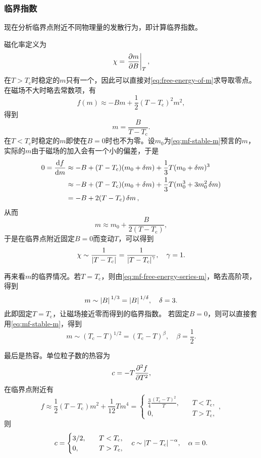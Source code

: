 \documentclass[hyperref, UTF8, a4paper]{ctexart}
\begin{document}
\subsubsection{临界指数}

现在分析临界点附近不同物理量的发散行为，即计算临界指数。

磁化率定义为
\[
    \chi = \eval{\pdv{m}{B}}_{T},
\]
在$T>T_\text{c}$时稳定的$m$只有一个，因此可以直接对\eqref{eq:free-energy-of-m}求导取零点。
在磁场不大时略去常数项，有
\[
    f(m) \approx - B m + \frac{1}{2} (T-T_\text{c})^2 m^2,
\]
得到
\[
    m = \frac{B}{T-T_\text{c}}.
\]
在$T<T_\text{c}$时稳定的$m$即使在$B=0$时也不为零。设$m_0$为\eqref{eq:mf-stable-m}预言的$m$，实际的$m$由于磁场的加入会有一个小的偏差，于是
\[
    \begin{aligned}
        0 = \dv{f}{m} &\approx - B + (T - T_\text{c}) (m_0 + \var{m}) + \frac{1}{3} T (m_0 + \var{m})^3 \\
        &\approx - B + (T-T_\text{c}) (m_0 + \var{m}) + \frac{1}{3} T (m_0^3 + 3 m_0^2 \var{m}) \\
        &= - B + 2(T-T_\text{c}) \var{m},
    \end{aligned}
\]
从而
\[
    m \approx m_0 + \frac{B}{2(T-T_\text{c})},
\]
于是在临界点附近固定$B=0$而变动$T$，可以得到
\begin{equation}
    \chi \sim \frac{1}{\abs{T-T_\text{c}}} = \frac{1}{\abs{T-T_\text{c}}^\gamma}, \quad \gamma = 1. 
\end{equation}

再来看$m$的临界情况。若$T=T_\text{c}$，则由\eqref{eq:mf-free-energy-series-m}，略去高阶项，得到
\begin{equation}
    m \sim \abs*{B}^{1/3} = \abs*{B}^{1/\delta}, \quad \delta = 3.
\end{equation}
此即固定$T=T_\text{c}$，让磁场接近零而得到的临界指数。
若固定$B=0$，则可以直接套用\eqref{eq:mf-stable-m}，得到
\begin{equation}
    m \sim (T_\text{c}-T)^{1/2} = (T_\text{c}-T)^\beta, \quad \beta = \frac{1}{2}.
\end{equation}

最后是热容。单位粒子数的热容为
\[
    c = - T \pdv[2]{f}{T},
\]
在临界点附近有
\[
    f \approx \frac{1}{2} (T-T_\text{c}) m^2 + \frac{1}{12} T m^4 
    = \begin{cases}
        \frac{3}{4} \frac{(T_\text{c}-T)^2}{T}, &\quad T < T_\text{c}, \\
        0, &\quad T > T_\text{c},
    \end{cases},
\]
则
\begin{equation}
    c = \begin{cases}
        3/2, &\quad T < T_\text{c}, \\
        0, &\quad T > T_\text{c}, 
    \end{cases}
    \quad c \sim \abs*{T-T_\text{c}}^{-\alpha}, \quad \alpha = 0.
    \label{eq:mf-c-divergence}
\end{equation}
\end{document}
